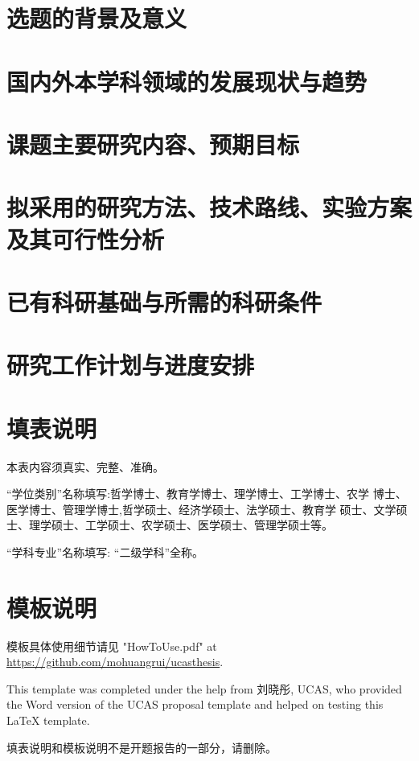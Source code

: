 \section{选题的背景及意义}

\section{国内外本学科领域的发展现状与趋势}

\section{课题主要研究内容、预期目标}

\section{拟采用的研究方法、技术路线、实验方案及其可行性分析}

\section{已有科研基础与所需的科研条件}

\section{研究工作计划与进度安排}

\section*{填表说明}

本表内容须真实、完整、准确。

“学位类别”名称填写:哲学博士、教育学博士、理学博士、工学博士、农学 博士、医学博士、管理学博士,哲学硕士、经济学硕士、法学硕士、教育学 硕士、文学硕士、理学硕士、工学硕士、农学硕士、医学硕士、管理学硕士等。

“学科专业”名称填写: “二级学科”全称。

\section*{模板说明}

模板具体使用细节请见 "HowToUse.pdf" at \url{https://github.com/mohuangrui/ucasthesis}.

This template was completed under the help from 刘晓彤, UCAS, who provided the Word version of the UCAS proposal template and helped on testing this \LaTeX{} template.

填表说明和模板说明不是开题报告的一部分，请删除。


